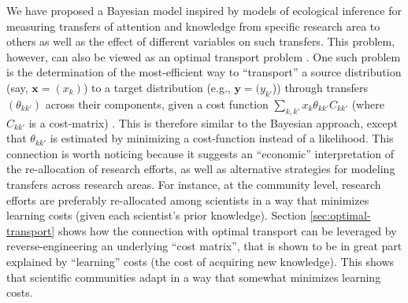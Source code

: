\documentclass{article}
\begin{document}
We have proposed a Bayesian model inspired by models of ecological inference for measuring transfers of attention and knowledge from specific research area to others as well as the effect of different variables on such transfers. This problem, however, can also be viewed as an optimal transport problem \citep{muzellec2017tsallis,li2019learning}. One such problem is the determination of the most-efficient way to  ``transport'' a source distribution (say, $\bm{x}=(x_k)$) to a target distribution (e.g., $\bm{y}=(y_{k'}$)) through transfers $(\theta_{kk'})$ across their components,   given a cost function $\sum_{k,k'} x_{k} \theta_{kk'}C_{kk'}$ (where $C_{kk'}$ is a cost-matrix) \citep{Peyre2018}. This is therefore similar to the Bayesian approach, except that $\theta_{kk'}$ is estimated by minimizing a cost-function instead of a likelihood. This connection is worth noticing because it suggests an ``economic'' interpretation of the re-allocation of research efforts, as well as alternative strategies for modeling transfers across research areas. For instance, at the community level, research efforts are preferably re-allocated among scientists in a way that minimizes learning costs (given each scientist's prior knowledge). Section \ref{sec:optimal-transport} shows how the connection with optimal transport can be leveraged by reverse-engineering an underlying ``cost matrix'', that is shown to be in great part explained by ``learning'' costs (the cost of acquiring new knowledge). This shows that scientific communities adapt in a way that somewhat minimizes learning costs.  %


\end{document}
